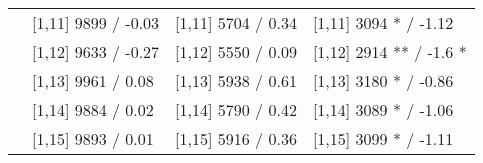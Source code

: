 \begin{table}
\begin{tabular}[t]{llll}
 & {}[1,11] 9899  / -0.03 & {}[1,11] 5704  / 0.34 & {}[1,11] 3094 * / -1.12\\
 & {}[1,12] 9633  / -0.27 & {}[1,12] 5550  / 0.09 & {}[1,12] 2914 ** / -1.6 *\\
\addlinespace
 & {}[1,13] 9961  / 0.08 & {}[1,13] 5938  / 0.61 & {}[1,13] 3180 * / -0.86\\
 & {}[1,14] 9884  / 0.02 & {}[1,14] 5790  / 0.42 & {}[1,14] 3089 * / -1.06\\
 & {}[1,15] 9893  / 0.01 & {}[1,15] 5916  / 0.36 & {}[1,15] 3099 * / -1.11\\
\bottomrule
\end{tabular}
\end{table}
